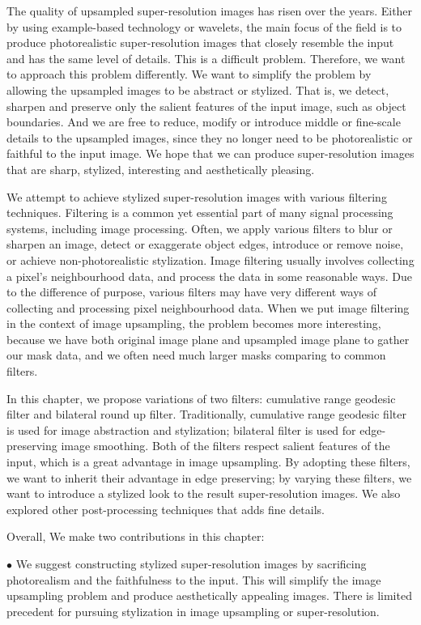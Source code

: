 The quality of upsampled super-resolution images has risen over the years. Either by using example-based technology or wavelets, the main focus of the field is to produce photorealistic super-resolution images that closely resemble the input and has the same level of details. This is a difficult problem. Therefore, we want to approach this problem differently. We want to simplify the problem by allowing the upsampled images to be abstract or stylized. That is, we detect, sharpen and preserve only the salient features of the input image, such as object boundaries. And we are free to reduce, modify or introduce middle or fine-scale details to the upsampled images, since they no longer need to be photorealistic or faithful to the input image. We hope that we can produce super-resolution images that are sharp, stylized, interesting and aesthetically pleasing.

We attempt to achieve stylized super-resolution images with various filtering techniques. Filtering is a common yet essential part of many signal processing systems, including image processing. Often, we apply various filters to blur or sharpen an image, detect or exaggerate object edges, introduce or remove noise, or achieve non-photorealistic stylization. Image filtering usually involves collecting a pixel’s neighbourhood data, and process the data in some reasonable ways. Due to the difference of purpose, various filters may have very different ways of collecting and processing pixel neighbourhood data. When we put image filtering in the context of image upsampling, the problem becomes more interesting, because we have both original image plane and upsampled image plane to gather our mask data, and we often need much larger masks comparing to common filters.

In this chapter, we propose variations of two filters: cumulative range geodesic filter and bilateral round up filter. Traditionally, cumulative range geodesic filter is used for image abstraction and stylization; bilateral filter is used for edge-preserving image smoothing. Both of the filters respect salient features of the input, which is a great advantage in image upsampling. By adopting these filters, we want to inherit their advantage in edge preserving; by varying these filters, we want to introduce a stylized look to the result super-resolution images. We also explored other post-processing techniques that adds fine details.

Overall, We make two contributions in this chapter:

$\bullet$ We suggest constructing stylized super-resolution images by sacrificing photorealism and the faithfulness to the input. This will simplify the image upsampling problem and produce aesthetically appealing images. There is limited precedent for pursuing stylization in image upsampling or super-resolution.

